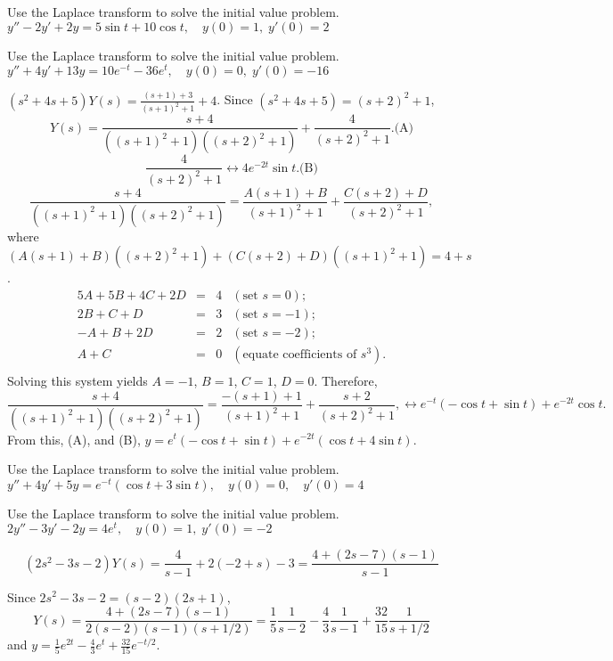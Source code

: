 \documentclass{ximera}
\begin{document}
\begin{problem}\label{exer:8.3.29} Use the Laplace transform to solve the initial value problem. $y''-2y'+2y=5\sin t+10\cos t, \quad  y(0)=1,\;
y'(0)=2$
\end{problem}

\begin{problem}\label{exer:8.3.30} Use the Laplace transform to solve the initial value problem. $y''+4y'+13y=10e^{-t}-36e^t, \quad  y(0)=0,\;
y'(0)=-16$

\begin{solution}
$(s^2+4s+5)Y(s)=\frac{(s+1)+3}{(s+1)^2+1}+4$.
Since $(s^2+4s+5)=(s+2)^2+1$,
$$
Y(s)=\frac{s+4}{((s+1)^2+1)((s+2)^2+1)}+\frac{4}{(s+2)^2+1}.
\text{(A)}
$$
$$
\frac{4}{(s+2)^2+1}
\leftrightarrow 4e^{-2t}\sin t.
\text{(B)}
$$
$$
\frac{s+4}{((s+1)^2+1)((s+2)^2+1)}=\frac{A(s+1)+B}{(s+1)^2+1}+\frac{C(s+2)+D}{(s+2)^2+1},
$$
where
$\left(A(s+1)+B\right)\left((s+2)^2+1\right)+
\left(C(s+2)+D\right)\left((s+1)^2+1\right)=4+s$.
$$
\begin{array}{rcll}
5A+5B+4C+2D&=&4&(\mbox{set }s=0);\\
2B+C+D&=&3&(\mbox{set }s=-1);\\
-A+B+2D&=&2&(\mbox{set }s=-2);\\
A+C&=&0&(\mbox{equate coefficients of }s^3).\\
\end{array}
$$
Solving this system yields $A=-1$, $B=1$, $C=1$, $D=0$. Therefore,
$$
\frac{s+4}{((s+1)^2+1)((s+2)^2+1)}=\frac{-(s+1)+1}{(s+1)^2+1}+\frac{s+2}{(s+2)^2+1},
\leftrightarrow e^{-t}(-\cos t+\sin t)+e^{-2t}\cos t.
$$
From this, (A), and (B),
$y=e^t(-\cos t+\sin t)+e^{-2t}(\cos t+4\sin t)$.
\end{solution}
\end{problem}

\begin{problem}\label{exer:8.3.31} Use the Laplace transform to solve the initial value problem. $y''+4y'+5y=e^{-t}(\cos t+3\sin t), \quad
y(0)=0,\quad y'(0)=4$
\end{problem}

\begin{problem}\label{exer:8.3.32} Use the Laplace transform to solve the initial value problem. $2y''-3y'-2y=4e^t, \quad   y(0)=1,\;  y'(0)=-2$

\begin{solution}
$$
(2s^2-3s-2)Y(s)=\frac{4}{s-1}+2(-2+s)-3=\frac{4+(2s-7)(s-1)}{s-1}
$$

Since $2s^2-3s-2=(s-2)(2s+1)$,
$$
Y(s)=\frac{4+(2s-7)(s-1)}{2(s-2)(s-1)(s+1/2)}=
\frac{1}{5}\frac{1}{s-2}-\frac{4}{3}\frac{1}{s-1}+\frac{32}{15}\frac{1}{s+1/2}
$$
and
 $y=\frac{1}{5}e^{2t}-\frac{4}{3}e^t
+\frac{32}{15}e^{-t/2}$.
\end{solution}
\end{problem}
\end{document}
